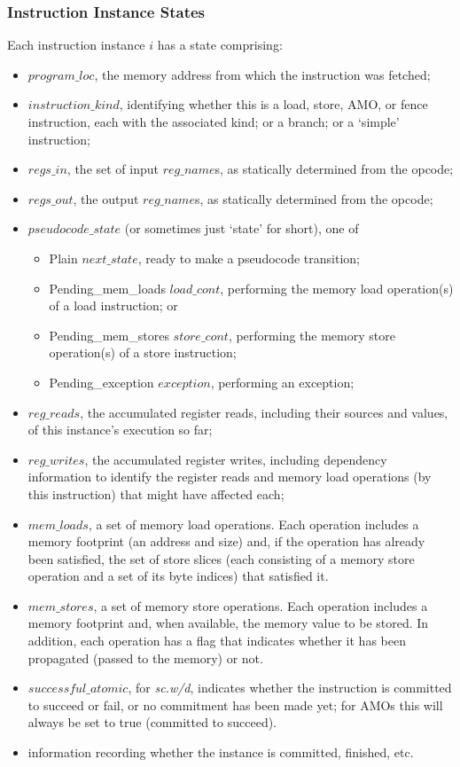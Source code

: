 \subsubsection{Instruction Instance States}\label{sec:omm:inst_state}
Each instruction instance $i$ has a state comprising:
\begin{itemize}
\item $program\_loc$, the memory address from which the instruction was fetched;
\item $instruction\_kind$, identifying whether this is a load, store, AMO, or fence instruction, each with the associated kind; or a branch; or a `simple' instruction;
\item $regs\_in$, the set of input $reg\_name$s, as statically determined from the opcode;
\item $regs\_out$, the output $reg\_name$s, as statically determined from the opcode;
\item $pseudocode\_state$ (or sometimes just `state' for short), one of
  \begin{itemize}
  \item {\sc Plain} $next\_state$, ready to make a pseudocode transition;
  \item {\sc Pending\_mem\_loads} $load\_cont$, performing the memory load operation(s) of a load instruction; or
  \item {\sc Pending\_mem\_stores} $store\_cont$, performing the memory store operation(s) of a store instruction;
  \item {\sc Pending\_exception} $exception$, performing an exception;
  \end{itemize}
\item $reg\_reads$, the accumulated register reads, including their sources and values, of this instance's execution so far;
\item $reg\_writes$, the accumulated register writes, including dependency information to identify the register reads and memory load operations (by this instruction) that might have affected each;
\item $mem\_loads$, a set of memory load operations.
Each operation includes a memory footprint (an address and size) and, if the operation has already been satisfied, the set of store slices (each consisting of a memory store operation and a set of its byte indices) that satisfied it.
\item $mem\_stores$, a set of memory store operations.
Each operation includes a memory footprint and, when available, the memory value to be stored.
In addition, each operation has a flag that indicates whether it has been propagated (passed to the memory) or not.
\item $successful\_atomic$, for {\em sc.w/d}, indicates whether the instruction is committed to succeed or fail, or no commitment has been made yet; for AMOs this will always be set to true (committed to succeed).
\item information recording whether the instance is committed, finished, etc.
\end{itemize}

